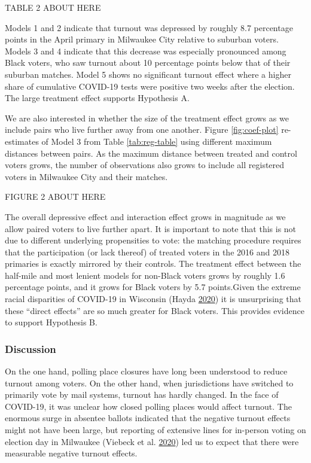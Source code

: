 \documentclass[
  12pt,
]{article}
\begin{document}
TABLE 2 ABOUT HERE

Models 1 and 2 indicate that turnout was depressed by roughly 8.7 percentage points in the April primary in Milwaukee City relative to suburban voters. Models 3 and 4 indicate that this decrease was especially pronounced among Black voters, who saw turnout about 10 percentage points below that of their suburban matches. Model 5 shows no significant turnout effect where a higher share of cumulative COVID-19 tests were positive two weeks after the election. The large treatment effect supports Hypothesis A.

We are also interested in whether the size of the treatment effect grows as we include pairs who live further away from one another. Figure \ref{fig:coef-plot} re-estimates of Model 3 from Table \ref{tab:reg-table} using different maximum distances between pairs. As the maximum distance between treated and control voters grows, the number of observations also grows to include all registered voters in Milwaukee City and their matches.

FIGURE 2 ABOUT HERE

The overall depressive effect and interaction effect grows in magnitude as we allow paired voters to live further apart. It is important to note that this is not due to different underlying propensities to vote: the matching procedure requires that the participation (or lack thereof) of treated voters in the 2016 and 2018 primaries is exactly mirrored by their controls. The treatment effect between the half-mile and most lenient models for non-Black voters grows by roughly 1.6 percentage points, and it grows for Black voters by 5.7 points.Given the extreme racial disparities of COVID-19 in Wisconsin (Hayda \protect\hyperlink{ref-Hayda2020}{2020}) it is unsurprising that these ``direct effects'' are so much greater for Black voters. This provides evidence to support Hypothesis B.

\hypertarget{discussion}{%
\subsubsection*{Discussion}\label{discussion}}

On the one hand, polling place closures have long been understood to reduce turnout among voters. On the other hand, when jurisdictions have switched to primarily vote by mail systems, turnout has hardly changed. In the face of COVID-19, it was unclear how closed polling places would affect turnout. The enormous surge in absentee ballots indicated that the negative turnout effects might not have been large, but reporting of extensive lines for in-person voting on election day in Milwaukee (Viebeck et al. \protect\hyperlink{ref-Viebeck2020}{2020}) led us to expect that there were measurable negative turnout effects.
\end{document}

